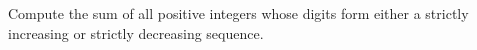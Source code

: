 Compute the sum of all positive integers whose digits form either a strictly increasing or strictly decreasing sequence.